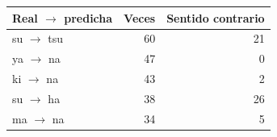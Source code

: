 \begin{tabular}{lrr}
\toprule
Real $\to$ predicha & Veces & Sentido contrario \\
\midrule
su $\to$ tsu & 60 & 21 \\
ya $\to$ na & 47 & 0 \\
ki $\to$ na & 43 & 2 \\
su $\to$ ha & 38 & 26 \\
ma $\to$ na & 34 & 5 \\
\bottomrule
\end{tabular}
